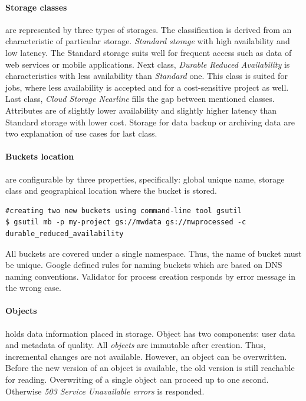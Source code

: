 \documentclass[a4paper,12pt,oneside]{report}
\begin{document}
	
	\paragraph{Storage classes} are represented by three types of storages. The
	classification is derived from an characteristic of particular storage. \textit{Standard
		storage} with high availability and low 
	latency. The Standard storage suits well for frequent access such 
	as data of web services or mobile applications.
	Next class, \textit{Durable Reduced Availability} is characteristics with less
	availability than  \textit{Standard} one. 
	This class is suited for jobs, where less availability is accepted and for a
	cost-sensitive project as well. 
	Last class, \textit{Cloud Storage Nearline} fills the gap between mentioned
	classes. Attributes are of slightly lower availability and slightly higher 
	latency than Standard storage with lower cost. 
	Storage for data backup or archiving data are two explanation of use cases for
	last class.
	
	\paragraph{Buckets location} are configurable by three properties, specifically:
	global unique 
	name, storage class and geographical location where the bucket is stored.
	\begin{footnotesize}
		\begin{lstlisting}[style=mybash]
#creating two new buckets using command-line tool gsutil
$ gsutil mb -p my-project gs://mwdata gs://mwprocessed -c
durable_reduced_availability
		\end{lstlisting}
	\end{footnotesize}
	All buckets are covered under a single namespace. Thus, the name of bucket must
	be unique. 
	Google defined rules for naming buckets which are based on DNS naming
	conventions. Validator for process creation responds by error message in the wrong
	case. 
	
	\paragraph{Objects} holds data information placed in storage. Object has two
	components: 
	user data and metadata of quality. All \textit{objects} are immutable after
	creation. Thus, incremental changes are not available. However, an object 
	can be overwritten. Before the new version of an object is available, the old
	version is still 
	reachable for reading. Overwriting of a single object 
	can proceed up to one second. Otherwise \textit{503 Service Unavailable errors}
	is responded.
	
\end{document}
